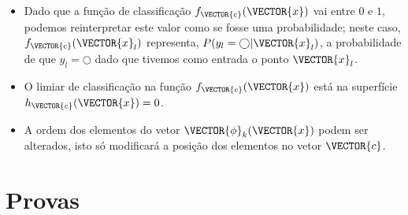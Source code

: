 \begin{tcbattention}
\begin{itemize}
\item Dado que a função de classificação $f_{\VECTOR{c}}(\VECTOR{x})$ vai entre $0$ e $1$,
podemos reinterpretar este valor como se fosse uma probabilidade;
neste caso, $f_{\VECTOR{c}}(\VECTOR{x}_l)$ representa, $P(y_l=\bigcirc|\VECTOR{x}_l)$, 
a probabilidade de que $y_l=\bigcirc$ dado que tivemos como entrada o ponto $\VECTOR{x}_l$.
\end{itemize}
\end{tcbattention}
\begin{tcbattention}
\begin{itemize}
\item O limiar de classificação na função $f_{\VECTOR{c}}(\VECTOR{x})$ está na superfície $h_{\VECTOR{c}}(\VECTOR{x})=0$.
\item A ordem dos elementos do vetor $\VECTOR{\phi}_{k}(\VECTOR{x})$ podem ser alterados,
isto só modificará a posição dos elementos no vetor $\VECTOR{c}$.
\end{itemize}
\end{tcbattention}

\section{Provas}


